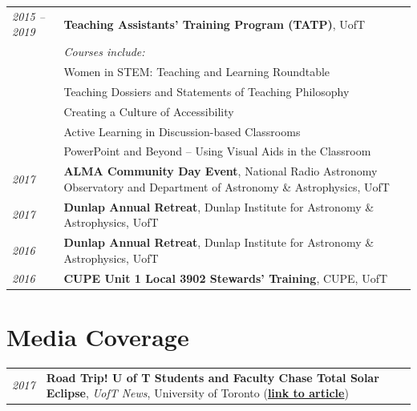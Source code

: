 \documentclass[10pt]{res} %
\begin{document}
\begin{resume}
\begin{table}[h!]
\begin{tabularx}{\textwidth}{lX}
\textit{2015 -- 2019}  & \textbf{Teaching Assistants' Training Program (TATP)}, UofT \\
				& \textit{Courses include:} \\
                                  & Women in STEM: Teaching and Learning Roundtable \\
                                  & Teaching Dossiers and Statements of Teaching Philosophy \\
                                  & Creating a Culture of Accessibility \\
                                  & Active Learning in Discussion-based Classrooms \\
                                  & PowerPoint and Beyond -- Using Visual Aids in the Classroom \\
\textit{2017} & \textbf{ALMA Community Day Event}, National Radio Astronomy Observatory and Department of Astronomy \& Astrophysics, UofT \\
\textit{2017} & \textbf{Dunlap Annual Retreat}, Dunlap Institute for Astronomy \& Astrophysics, UofT \\
\textit{2016} & \textbf{Dunlap Annual Retreat}, Dunlap Institute for Astronomy \& Astrophysics, UofT \\
\textit{2016} & \textbf{CUPE Unit 1 Local 3902 Stewards' Training}, CUPE, UofT
\end{tabularx}
\end{table}


\newpage
\section{\Large Media Coverage}
\vspace{-5pt} %
\noindent\makebox[\linewidth]{\rule{\textwidth}{0.4pt}}
\vspace{-20pt} %

\begin{table}[h!]
\begin{tabularx}{\textwidth}{lX}
\textit{2017} & \textbf{Road Trip! U of T Students and Faculty Chase Total Solar Eclipse}, \textit{UofT News}, University of Toronto (\href{https://www.utoronto.ca/news/road-trip-u-t-students-and-faculty-chase-total-solar-eclipse}{\textbf{link to article}})
\end{tabularx}
\end{table}


\end{resume}
\end{document}
